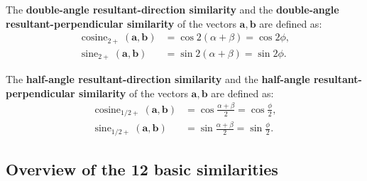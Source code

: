 \begin{definition}\label{def:double_sum_similarity}
The \textbf{double-angle resultant-direction similarity} and the \textbf{double-angle resultant-perpendicular similarity} of the vectors $\mathbf{a}, \mathbf{b}$ are defined as:
\begin{align*}
\operatorname{cosine}_{2+}(\mathbf{a}, \mathbf{b}) &= \cos 2(\alpha + \beta) = \cos 2\phi, \\
\operatorname{sine}_{2+}(\mathbf{a}, \mathbf{b}) &= \sin 2(\alpha + \beta) = \sin 2\phi.
\end{align*}
\end{definition}

\begin{definition}\label{def:half_sum_similarity}
The \textbf{half-angle resultant-direction similarity} and the \textbf{half-angle resultant-perpendicular similarity} of the vectors $\mathbf{a}, \mathbf{b}$ are defined as:
\begin{align*}
\operatorname{cosine}_{1/2+}(\mathbf{a}, \mathbf{b}) &= \cos\frac{\alpha + \beta}{2} = \cos\frac{\phi}{2}, \\
\operatorname{sine}_{1/2+}(\mathbf{a}, \mathbf{b}) &= \sin\frac{\alpha + \beta}{2} = \sin\frac{\phi}{2}.
\end{align*}
\end{definition}
\subsection{\texorpdfstring{Overview of the 12 basic similarities}{Overview of the 12 basic similarities}}


